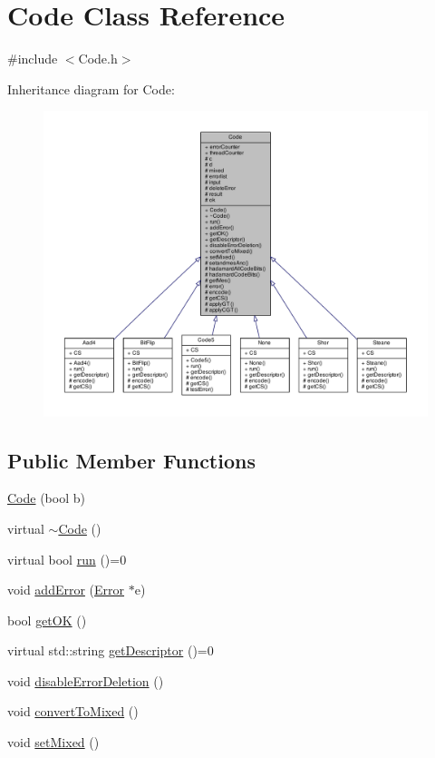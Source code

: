 \hypertarget{class_code}{}\section{Code Class Reference}
\label{class_code}


{\ttfamily \#include $<$Code.\+h$>$}



Inheritance diagram for Code\+:\nopagebreak
\begin{figure}[H]
\begin{center}
\leavevmode
\includegraphics[width=350pt]{class_code__inherit__graph}
\end{center}
\end{figure}
\subsection*{Public Member Functions}
\begin{DoxyCompactItemize}
\item 
\hyperlink{class_code_ac37d2241363b2bfcd11db0e02d3acad6}{Code} (bool b)
\item 
virtual \hyperlink{class_code_ad9a1e323c3ed4d36aeff17faffe1e770}{$\sim$\+Code} ()
\item 
virtual bool \hyperlink{class_code_a5621bbd050948ba1e41f69f451a05990}{run} ()=0
\item 
void \hyperlink{class_code_a79f6282eeac2d8c2d61bab55ddf2e797}{add\+Error} (\hyperlink{class_error}{Error} $\ast$e)
\item 
bool \hyperlink{class_code_a6a7ff74d4db8bc010c750afa1f1743c1}{get\+OK} ()
\item 
virtual std\+::string \hyperlink{class_code_a60db2f615a7cff76e3ece1c486b2fd16}{get\+Descriptor} ()=0
\item 
void \hyperlink{class_code_a58a0c6a1b046c6d20703d32c6a7fefbc}{disable\+Error\+Deletion} ()
\item 
void \hyperlink{class_code_ae26ecba630093dcac2b7c01946678cb0}{convert\+To\+Mixed} ()
\item 
void \hyperlink{class_code_a85f5a2e8133b68173334f24d66f4d5a9}{set\+Mixed} ()
\end{DoxyCompactItemize}
